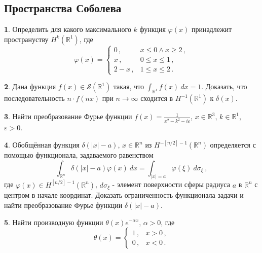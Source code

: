 \documentclass[a4paper, 12pt]{article}
\theoremstyle{definition}
\newtheorem{exercise}{}
\begin{document}
\subsection{Пространства Соболева} %

\begin{exercise} %
    Определить для какого максимального \({ k }\) функция \({ \varphi(x) }\) принадлежит пространуству \({ H^{k}(\mathbb R^{1}) }\), где \[
        \varphi(x) = \begin{cases}
            0\,, & x \leqslant 0 \land x \geqslant 2\,, \\
            x\,, & 0 \leqslant x \leqslant 1\,, \\
            2 - x\,, & 1 \leqslant x \leqslant 2\,.
        \end{cases}
    \] 
\end{exercise}

\begin{exercise} %
    Дана функция \({ f(x) \in \mathcal S(\mathbb R^{1}) }\)  такая, что \({ \int_{\mathbb R^{1}} f(x)\: dx = 1 }\). Доказать, что последовательность \({ n \cdot f(nx) }\) при \({ n \to \infty }\) сходится в \({ H^{-1}(\mathbb R^{1}) }\) к \({ \delta(x) }\).
\end{exercise}

\begin{exercise} %
    Найти преобразование Фурье функции \({ f(x) = \frac{1}{x^2 - k^2 - i\varepsilon} }\), \({ x \in \mathbb R^{3} }\), \({ k \in \mathbb R^{1} }\), \({ \varepsilon > 0 }\).
\end{exercise}

\begin{exercise} %
    Обобщённая функция \({ \delta(\lvert x \rvert - a) }\), \({ x \in \mathbb R^{n} }\) из \({ H^{-[n/2]-1}(\mathbb R^{n}) }\) определяется с помощью функционала, задаваемого равенством \[
        \int_{\mathbb R^{n}}  \delta(\lvert x \rvert - a) \varphi(x)\: dx = \int_{\lvert x \rvert = a} \varphi(\xi)\: d\sigma_{\xi}\,,
    \] где \({ \varphi(x) \in H^{[n / 2]-1}(\mathbb R^{n}) }\), \({ d\sigma_{\xi} }\) - элемент поверхности сферы радиуса \({ a }\) в \({ \mathbb R^{n} }\) с центром в начале координат. Доказать ограниченность функционала задачи и найти преобразование Фурье функции \({ \delta(\lvert x \rvert - a) }\).
\end{exercise}

\begin{exercise} %
    Найти производную функции \({ \theta(x) e^{-\alpha x} }\), \({ \alpha > 0 }\), где \[
        \theta(x) = \begin{cases}
            1\,, & x > 0\,, \\
            0\,, & x < 0\,.
        \end{cases}
    \] 
\end{exercise}
\end{document}
